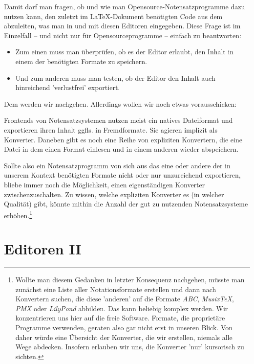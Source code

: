 \documentclass[
  DIV=calc,
  BCOR=5mm,
  12pt,
  headings=small,
  twoside,
  abstract=true,
  toc=bib,
  xcolor=dvipsnames,
  openany,
  english,ngerman]{scrbook}
\begin{document}
Damit darf man fragen, ob und wie man Opensource-Notensatzprogramme dazu nutzen
kann, den zuletzt im \LaTeX-Dokument benötigten Code aus dem abzuleiten, was man
in und mit diesen Editoren eingegeben. Diese Frage ist im Einzelfall -- und
nicht nur für Opensourceprogramme -- einfach zu beantworten:

\begin{itemize}
\item Zum einen muss man überprüfen, ob es der Editor erlaubt, den Inhalt in
einem der benötigten Formate zu speichern.
\item Und zum anderen muss man testen, ob der Editor den Inhalt auch
hinreichend 'verlustfrei' exportiert.
\end{itemize}

Dem werden wir nachgehen. Allerdings wollen wir noch etwas vorausschicken:

Frontends von Notensatzsystemen nutzen meist ein natives Dateiformat und
exportieren ihren Inhalt ggfls. in Fremdformate. Sie agieren implizit als
Konverter. Daneben gibt es noch eine Reihe von expliziten Konvertern, die eine
Datei in dem einen Format einlesen und in einem anderen wieder abspeichern.

Sollte also ein Notensatzprogramm von sich aus das eine oder andere der in
unserem Kontext benötigten Formate nicht oder nur unzureichend exportieren,
bliebe immer noch die Möglichkeit, einen eigenständigen Konverter
zwischenzuschalten. Zu wissen, welche expliziten Konverter es (in welcher
Qualität) gibt, könnte mithin die Anzahl der gut zu nutzenden Notensatzsysteme
erhöhen.\footnote{Wollte man diesem Gedanken in letzter Konsequenz nachgehen,
müsste man zunächst eine Liste aller Notationsformate erstellen und dann nach
Konvertern suchen, die diese 'anderen' auf die Formate \textit{ABC},
\textit{Musix\TeX}, \textit{PMX} oder \textit{LilyPond} abbilden. Das kann beliebig
komplex werden. Wir konzentrieren uns hier auf die freie Software. Formate, die
proprietäre Programme verwenden, geraten also gar nicht erst in unseren Blick.
Von daher würde eine Übersicht der Konverter, die wir erstellen, niemals alle
Wege abdecken. Insofern erlauben wir uns, die Konverter 'nur' kursorisch zu
sichten.}








\section{Editoren II}
\end{document}
